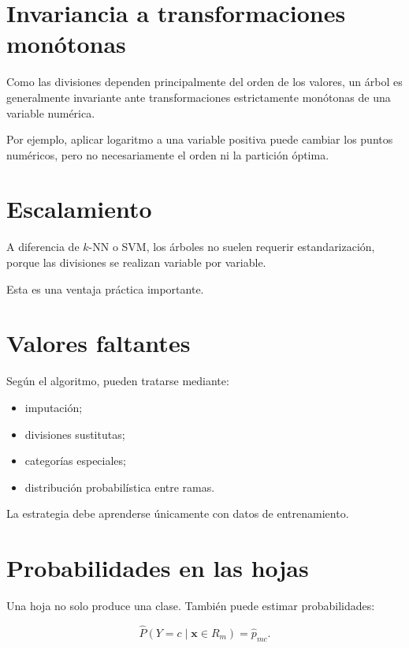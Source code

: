 \documentclass[
  spanish,
  11pt,
  letterpaper,
  DIV=11,
  numbers=noendperiod]{scrreprt}
\providecommand{\tightlist}{%
  \setlength{\itemsep}{0pt}\setlength{\parskip}{0pt}}
\theoremstyle{definition}
\theoremstyle{plain}
\theoremstyle{definition}
\theoremstyle{remark}
\begin{document}
\section{Invariancia a transformaciones
monótonas}\label{invariancia-a-transformaciones-monuxf3tonas}

Como las divisiones dependen principalmente del orden de los valores, un
árbol es generalmente invariante ante transformaciones estrictamente
monótonas de una variable numérica.

Por ejemplo, aplicar logaritmo a una variable positiva puede cambiar los
puntos numéricos, pero no necesariamente el orden ni la partición
óptima.

\section{Escalamiento}\label{escalamiento}

A diferencia de \(k\)-NN o SVM, los árboles no suelen requerir
estandarización, porque las divisiones se realizan variable por
variable.

Esta es una ventaja práctica importante.

\section{Valores faltantes}\label{valores-faltantes}

Según el algoritmo, pueden tratarse mediante:

\begin{itemize}
\tightlist
\item
  imputación;
\item
  divisiones sustitutas;
\item
  categorías especiales;
\item
  distribución probabilística entre ramas.
\end{itemize}

La estrategia debe aprenderse únicamente con datos de entrenamiento.

\section{Probabilidades en las hojas}\label{probabilidades-en-las-hojas}

Una hoja no solo produce una clase. También puede estimar
probabilidades:

\[
\widehat{P}(Y=c\mid\mathbf{x}\in R_m)
=
\widehat{p}_{mc}.
\]
\end{document}
